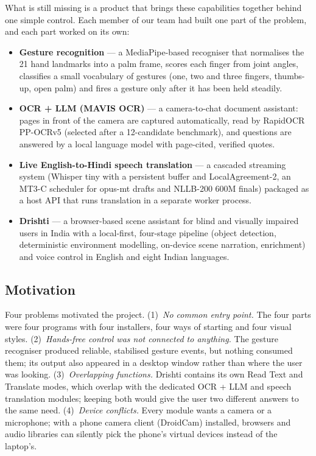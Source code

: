 \documentclass[12pt,singleside,a4paper]{article}
\begin{document}
What is still missing is a product that brings these capabilities together behind one simple control. Each member of our team had built one part of the problem, and each part worked on its own:
\begin{itemize}[leftmargin=*]
\item \textbf{Gesture recognition} --- a MediaPipe-based recogniser that normalises the 21 hand landmarks into a palm frame, scores each finger from joint angles, classifies a small vocabulary of gestures (one, two and three fingers, thumbs-up, open palm) and fires a gesture only after it has been held steadily.
\item \textbf{OCR + LLM (MAVIS OCR)} --- a camera-to-chat document assistant: pages in front of the camera are captured automatically, read by RapidOCR PP-OCRv5 (selected after a 12-candidate benchmark), and questions are answered by a local language model with page-cited, verified quotes.
\item \textbf{Live English-to-Hindi speech translation} --- a cascaded streaming system (Whisper tiny with a persistent buffer and LocalAgreement-2, an MT3-C scheduler for opus-mt drafts and NLLB-200 600M finals) packaged as a host API that runs translation in a separate worker process.
\item \textbf{Drishti} --- a browser-based scene assistant for blind and visually impaired users in India with a local-first, four-stage pipeline (object detection, deterministic environment modelling, on-device scene narration, enrichment) and voice control in English and eight Indian languages.
\end{itemize}

\subsection{Motivation}
Four problems motivated the project. (1)~\emph{No common entry point.} The four parts were four programs with four installers, four ways of starting and four visual styles. (2)~\emph{Hands-free control was not connected to anything.} The gesture recogniser produced reliable, stabilised gesture events, but nothing consumed them; its output also appeared in a desktop window rather than where the user was looking. (3)~\emph{Overlapping functions.} Drishti contains its own Read Text and Translate modes, which overlap with the dedicated OCR + LLM and speech translation modules; keeping both would give the user two different answers to the same need. (4)~\emph{Device conflicts.} Every module wants a camera or a microphone; with a phone camera client (DroidCam) installed, browsers and audio libraries can silently pick the phone's virtual devices instead of the laptop's.
\end{document}
